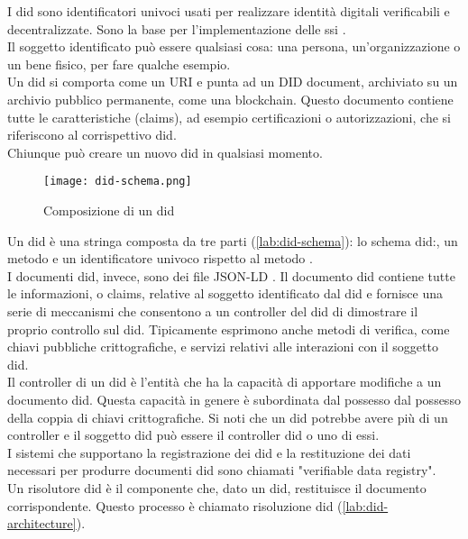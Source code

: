 I \gls{did} sono identificatori univoci usati per realizzare identità digitali verificabili e decentralizzate. Sono la base per l'implementazione delle \gls{ssi} \cite{art:ssi}. \\
Il soggetto identificato può essere qualsiasi cosa: una persona, un'organizzazione o un bene fisico, per fare qualche esempio. \\
Un \gls{did} si comporta come un URI e punta ad un DID document, archiviato su un archivio pubblico permanente, come una blockchain.
Questo documento contiene tutte le caratteristiche (claims), ad esempio certificazioni o autorizzazioni, che si riferiscono al corrispettivo \gls{did}. \\
Chiunque può creare un nuovo \gls{did} in qualsiasi momento.

\begin{figure}[ht]
    \texttt{[image: did-schema.png]}
    \centering
    \caption{Composizione di un \gls{did} \cite{img:did-schema}}
    \label{lab:did-schema}
\end{figure}

Un \gls{did} è una stringa composta da tre parti (\autoref{lab:did-schema}): lo schema did:, un metodo e un identificatore univoco rispetto al metodo \cite{wiki:did}. \\
I documenti \gls{did}, invece, sono dei file JSON-LD \cite{wiki:json-ld}. Il documento \gls{did} contiene tutte le informazioni, o claims, 
relative al soggetto identificato dal \gls{did} e fornisce una serie di meccanismi che consentono a un controller del \gls{did} di dimostrare il proprio controllo sul \gls{did}. 
Tipicamente esprimono anche metodi di verifica, come chiavi pubbliche crittografiche, e servizi relativi alle interazioni con il soggetto \gls{did}. \\
Il controller di un \gls{did} è l'entità che ha la capacità di apportare modifiche a un documento \gls{did}. Questa capacità in genere è subordinata dal possesso dal possesso della coppia di chiavi crittografiche. 
Si noti che un \gls{did} potrebbe avere più di un controller e il soggetto \gls{did} può essere il controller \gls{did} o uno di essi. \\
I sistemi che supportano la registrazione dei \gls{did} e la restituzione dei dati necessari per produrre documenti \gls{did} sono chiamati "verifiable data registry". \\
Un risolutore \gls{did} è il componente che, dato un \gls{did}, restituisce il documento corrispondente. Questo processo è chiamato risoluzione \gls{did} (\autoref{lab:did-architecture}).

